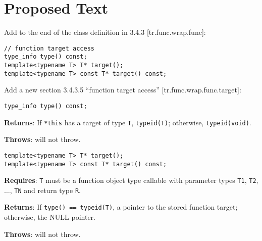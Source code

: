 \documentclass{article}
\begin{document}
\section{Proposed Text}
Add to the end of the class definition in 3.4.3 [tr.func.wrap.func]:
\begin{verbatim}
// function target access
type_info type() const;
template<typename T> T* target();
template<typename T> const T* target() const;
\end{verbatim}

Add a new section 3.4.3.5 ``function target access''  
[tr.func.wrap.func.target]:

\begin{verbatim}
type_info type() const;
\end{verbatim}

\noindent\textbf{Returns}: If \texttt{*this} has a target of type
\texttt{T}, \texttt{typeid(T)}; otherwise, \texttt{typeid(void)}.

\noindent\textbf{Throws}: will not throw.

\begin{verbatim}
template<typename T> T* target();
template<typename T> const T* target() const;
\end{verbatim}

\noindent\textbf{Requires}: \texttt{T} must be a function object type
callable with parameter types \texttt{T1}, \texttt{T2}, $\ldots$,
\texttt{TN} and return type \texttt{R}.

\noindent\textbf{Returns}: If \texttt{type() == typeid(T)}, a pointer
to the stored function target; otherwise, the NULL pointer.

\noindent\textbf{Throws}: will not throw.



\end{document}

